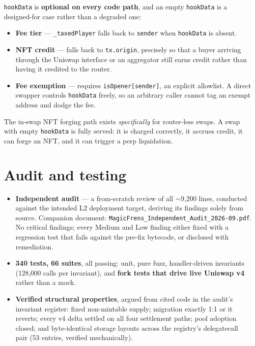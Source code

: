 \documentclass[11pt,a4paper]{article}
\newcommand{\code}[1]{\texttt{\small #1}}
\begin{document}
\code{hookData} is \textbf{optional on every code path}, and an empty
\code{hookData} is a designed-for case rather than a degraded one:

\begin{itemize}
\item \textbf{Fee tier} --- \code{\_taxedPlayer} falls back to \code{sender} when
\code{hookData} is absent.
\item \textbf{NFT credit} --- falls back to \code{tx.origin}, precisely so that a
buyer arriving through the Uniswap interface or an aggregator still earns credit
rather than having it credited to the router.
\item \textbf{Fee exemption} --- requires \code{isOpener[sender]}, an explicit
allowlist. A direct swapper controls \code{hookData} freely, so an arbitrary
caller cannot tag an exempt address and dodge the fee.
\end{itemize}

\noindent The in-swap NFT forging path exists \emph{specifically} for
router-less swaps. A swap with empty \code{hookData} is fully served: it is
charged correctly, it accrues credit, it can forge an NFT, and it can trigger a
perp liquidation.

\section{Audit and testing}
\label{sec:audit}

\begin{itemize}
\item \textbf{Independent audit} --- a from-scratch review of all $\sim$9{,}200
lines, conducted against the intended L2 deployment target, deriving its findings
solely from source. Companion document:
\code{MagicFrens\_Independent\_Audit\_2026-09.pdf}. No critical findings; every
Medium and Low finding either fixed with a regression test that fails against the
pre-fix bytecode, or disclosed with remediation.
\item \textbf{340 tests, 66 suites}, all passing: unit, pure fuzz,
handler-driven invariants (128{,}000 calls per invariant), and \textbf{fork tests
that drive live Uniswap v4} rather than a mock.
\item \textbf{Verified structural properties}, argued from cited code in the
audit's invariant register: fixed non-mintable supply; migration exactly 1:1 or
it reverts; every v4 delta settled on all four settlement paths; pool adoption
closed; and byte-identical storage layouts across the registry's delegatecall
pair (53 entries, verified mechanically).
\end{itemize}
\end{document}
